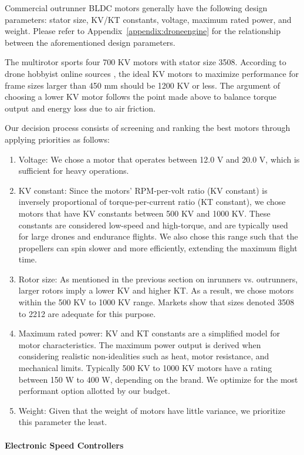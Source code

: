 Commercial outrunner BLDC motors generally have the following design parameters: stator size, KV/KT constants, voltage, maximum rated power, and weight. Please refer to Appendix~\ref{appendix:droneengine} for the relationship between the aforementioned design parameters. 

The multirotor sports four 700 KV motors with stator size 3508.  According to drone hobbyist online sources \cite{kv1, kv2}, the ideal KV motors to maximize performance for frame sizes larger than 450 mm should be 1200 KV or less. The argument of choosing a lower KV motor follows the point made above to balance torque output and energy loss due to air friction.

Our decision process consists of screening and ranking the best motors through applying priorities as follows:

\begin{enumerate}
	\item Voltage: We chose a motor that operates between 12.0 V and 20.0 V, which is sufficient for heavy operations.
	\item KV constant: Since the motors' RPM-per-volt ratio (KV constant) is inversely proportional of torque-per-current ratio (KT constant), we chose motors that have KV constants between 500 KV and 1000 KV. These constants are considered low-speed and high-torque, and are typically used for large drones and endurance flights. We also chose this range such that the propellers can spin slower and more efficiently, extending the maximum flight time.
	\item Rotor size: As mentioned in the previous section on inrunners vs. outrunners, larger rotors imply a lower KV and higher KT. As a result, we chose motors within the 500 KV to 1000 KV range. Markets show that sizes denoted 3508 to 2212 are adequate for this purpose.
	\item Maximum rated power: KV and KT constants are a simplified model for motor characteristics. The maximum power output is derived when considering realistic non-idealities such as heat, motor resistance, and mechanical limits. Typically 500 KV to 1000 KV motors have a rating between 150 W to 400 W, depending on the brand. We optimize for the most performant option allotted by our budget.
	\item Weight: Given that the weight of motors have little variance, we prioritize this parameter the least.
\end{enumerate}

\paragraph{Electronic Speed Controllers}

